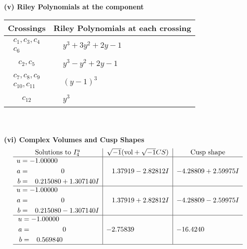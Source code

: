 \documentclass[1p]{elsarticle_modified}
\theoremstyle{definition}
\newcommand{\I}{\sqrt{-1}}
\begin{document}
\newpage\renewcommand{\arraystretch}{1}
\flushleft \textbf{(v) Riley Polynomials at the component}\newline \\
\begin{tabular}{m{50pt}|m{274pt}}
Crossings & \hspace{64pt}Riley Polynomials at each crossing \\
\hline $$\begin{aligned}c_{1},c_{3},c_{4}\\c_{6}\end{aligned}$$&$\begin{aligned}
&y^3+3 y^2+2 y-1
\end{aligned}$\\
\hline $$\begin{aligned}c_{2},c_{5}\end{aligned}$$&$\begin{aligned}
&y^3- y^2+2 y-1
\end{aligned}$\\
\hline $$\begin{aligned}c_{7},c_{8},c_{9}\\c_{10},c_{11}\end{aligned}$$&$\begin{aligned}
&(y-1)^3
\end{aligned}$\\
\hline $$\begin{aligned}c_{12}\end{aligned}$$&$\begin{aligned}
&y^3
\end{aligned}$\\
\hline
\end{tabular}\\~\\
\newpage\flushleft \textbf{(vi) Complex Volumes and Cusp Shapes}
$$\begin{array}{c|c|c}  
\text{Solutions to }I^u_{4}& \I (\text{vol} + \sqrt{-1}CS) & \text{Cusp shape}\\
 \hline 
\begin{aligned}
u &= -1.00000\phantom{ +0.000000I} \\
a &= \phantom{-0.000000 } 0 \\
b &= \phantom{-}0.215080 + 1.307140 I\end{aligned}
 & \phantom{-}1.37919 - 2.82812 I & -4.28809 + 2.59975 I \\ \hline\begin{aligned}
u &= -1.00000\phantom{ +0.000000I} \\
a &= \phantom{-0.000000 } 0 \\
b &= \phantom{-}0.215080 - 1.307140 I\end{aligned}
 & \phantom{-}1.37919 + 2.82812 I & -4.28809 - 2.59975 I \\ \hline\begin{aligned}
u &= -1.00000\phantom{ +0.000000I} \\
a &= \phantom{-0.000000 } 0 \\
b &= \phantom{-}0.569840\phantom{ +0.000000I}\end{aligned}
 & -2.75839\phantom{ +0.000000I} & -16.4240\phantom{ +0.000000I}\\
 \hline 
 \end{array}$$\newpage
\end{document}
